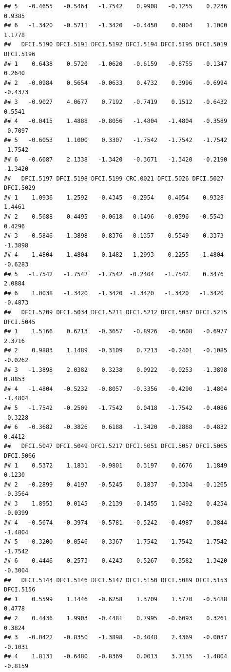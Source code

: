 \documentclass[
]{article}
\begin{document}
\begin{verbatim}
## 5   -0.4655   -0.5464   -1.7542    0.9908   -0.1255    0.2236    0.9385
## 6   -1.3420   -0.5711   -1.3420   -0.4450    0.6804    1.1000    1.1778
##   DFCI.5190 DFCI.5191 DFCI.5192 DFCI.5194 DFCI.5195 DFCI.5019 DFCI.5196
## 1    0.6438    0.5720   -1.0620   -0.6159   -0.8755   -0.1347    0.2640
## 2   -0.0984    0.5654   -0.0633    0.4732    0.3996   -0.6994   -0.4373
## 3   -0.9027    4.0677    0.7192   -0.7419    0.1512   -0.6432    0.5541
## 4   -0.0415    1.4888   -0.8056   -1.4804   -1.4804   -0.3589   -0.7097
## 5   -0.6053    1.1000    0.3307   -1.7542   -1.7542   -1.7542   -1.7542
## 6   -0.6087    2.1338   -1.3420   -0.3671   -1.3420   -0.2190   -1.3420
##   DFCI.5197 DFCI.5198 DFCI.5199 CRC.0021 DFCI.5026 DFCI.5027 DFCI.5029
## 1    1.0936    1.2592   -0.4345  -0.2954    0.4054    0.9328    1.4461
## 2    0.5688    0.4495   -0.0618   0.1496   -0.0596   -0.5543    0.4296
## 3   -0.5846   -1.3898   -0.8376  -0.1357   -0.5549    0.3373   -1.3898
## 4   -1.4804   -1.4804    0.1482   1.2993   -0.2255   -1.4804   -0.6283
## 5   -1.7542   -1.7542   -1.7542  -0.2404   -1.7542    0.3476    2.0884
## 6    1.0038   -1.3420   -1.3420  -1.3420   -1.3420   -1.3420   -0.4873
##   DFCI.5209 DFCI.5034 DFCI.5211 DFCI.5212 DFCI.5037 DFCI.5215 DFCI.5045
## 1    1.5166    0.6213   -0.3657   -0.8926   -0.5608   -0.6977    2.3716
## 2    0.9883    1.1489   -0.3109    0.7213   -0.2401   -0.1085   -0.0262
## 3   -1.3898    2.0382    0.3238    0.0922   -0.0253   -1.3898    0.8853
## 4   -1.4804   -0.5232   -0.8057   -0.3356   -0.4290   -1.4804   -1.4804
## 5   -1.7542   -0.2509   -1.7542    0.0418   -1.7542   -0.4086   -0.3228
## 6   -0.3682   -0.3826    0.6188   -1.3420   -0.2888   -0.4832    0.4412
##   DFCI.5047 DFCI.5049 DFCI.5217 DFCI.5051 DFCI.5057 DFCI.5065 DFCI.5066
## 1    0.5372    1.1831   -0.9801    0.3197    0.6676    1.1849    0.1230
## 2   -0.2899    0.4197   -0.5245    0.1837   -0.3304   -0.1265   -0.3564
## 3    1.8953    0.0145   -0.2139   -0.1455    1.0492    0.4254   -0.0399
## 4   -0.5674   -0.3974   -0.5781   -0.5242   -0.4987    0.3844   -1.4804
## 5   -0.3200   -0.0546   -0.3367   -1.7542   -1.7542   -1.7542   -1.7542
## 6    0.4446   -0.2573    0.4243    0.5267   -0.3582   -1.3420   -0.3004
##   DFCI.5144 DFCI.5146 DFCI.5147 DFCI.5150 DFCI.5089 DFCI.5153 DFCI.5156
## 1    0.5599    1.1446   -0.6258    1.3709    1.5770   -0.5488    0.4778
## 2    0.4436    1.9903   -0.4481    0.7995   -0.6093    0.3261    0.3824
## 3   -0.0422   -0.8350   -1.3898   -0.4048    2.4369   -0.0037   -0.1031
## 4    1.8131   -0.6480   -0.8369    0.0013    3.7135   -1.4804   -0.8159

\end{verbatim}
\end{document}
